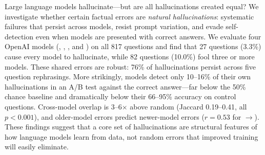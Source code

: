 Large language models hallucinate---but are all hallucinations created equal?
We investigate whether certain factual errors are \emph{natural hallucinations}: systematic failures that persist across models, resist prompt variation, and evade self-detection even when models are presented with correct answers.
We evaluate four OpenAI models (\gptfourone, \gptfouro, \gptfouromini, and \gptthreefive) on all 817 \truthfulqa questions and find that 27 questions (3.3\%) cause every model to hallucinate, while 82 questions (10.0\%) fool three or more models.
These shared errors are robust: 76\% of hallucinations persist across five question rephrasings.
More strikingly, models detect only 10--16\% of their own hallucinations in an A/B test against the correct answer---far below the 50\% chance baseline and dramatically below their 66--95\% accuracy on control questions.
Cross-model overlap is 3--6$\times$ above random (Jaccard 0.19--0.41, all $p < 0.001$), and older-model errors predict newer-model errors ($r = 0.53$ for \gptfouromini$\to$\gptfouro).
These findings suggest that a core set of hallucinations are structural features of how language models learn from data, not random errors that improved training will easily eliminate.
